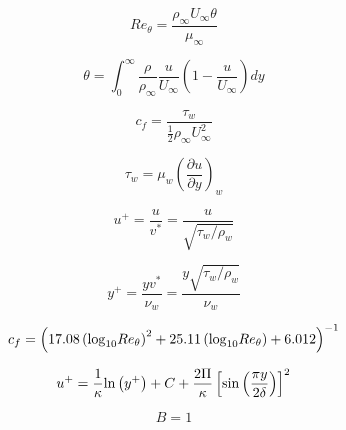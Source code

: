 

\begin{equation}
Re_{\theta} = \frac{\rho_{\infty} U_{\infty} \theta}{\mu_{\infty}}
\end{equation}

\begin{equation}
\theta = \int_0^{\infty} \frac{\rho}{\rho_{\infty}} \frac{u}{U_{\infty}} \left( 1 - \frac{u}{U_{\infty}} \right) dy
\end{equation}

\begin{equation}
c_f = \frac{\tau_w}{\frac{1}{2} \rho_{\infty} U_{\infty}^2}
\end{equation}

\begin{equation}
\tau_w = \mu_w \left( \frac{\partial u}{\partial y} \right)_w
\end{equation}

\begin{equation}
u^+ = \frac{u}{v^*} = \frac{u}{\sqrt{\tau_w / \rho_w}}
\end{equation}

\begin{equation}
y^+ = \frac{y v^*}{\nu_w} = \frac{y \sqrt{\tau_w / \rho_w}}{\nu_w}
\end{equation}

\begin{equation}
c_f = \left( 17.08 \left({\rm log}_{10}Re_{\theta} \right)^2 + 25.11 \left( {\rm log}_{10}Re_{\theta} \right) +
   6.012 \right)^{-1}
\end{equation}

\begin{equation}
u^+ = \frac{1}{\kappa} {\rm ln} \left( y^+ \right) + C + \frac{2 \Pi}{\kappa}
   \left[ {\rm sin} \left( \frac{\pi y}{2 \delta} \right) \right]^2
\end{equation}

\begin{equation}
B=1
\end{equation}


